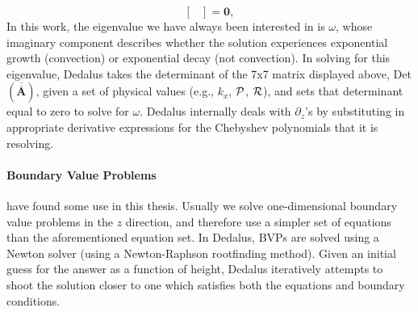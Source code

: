 \begin{enumerate}
\begin{equation}
\begin{bmatrix}
\end{bmatrix}
= \bm{0},
\end{equation}
In this work, the eigenvalue we have always been interested in is $\omega$, whose imaginary component describes whether the solution experiences exponential growth (convection) or exponential decay (not convection).
In solving for this eigenvalue, Dedalus takes the determinant of the 7x7 matrix displayed above, Det$(\bm{\overline{\overline{A}}})$, given a set of physical values (e.g., $k_x$, $\mathcal{P}$, $\mathcal{R}$), and sets that determinant equal to zero to solve for $\omega$.
Dedalus internally deals with $\partial_z$'s by substituting in appropriate derivative expressions for the Chebyshev polynomials that it is resolving.
\end{enumerate}

\paragraph{Boundary Value Problems} have found some use in this thesis.
Usually we solve one-dimensional boundary value problems in the $z$ direction, and therefore use a simpler set of equations than the aforementioned equation set.
In Dedalus, BVPs are solved using a Newton solver (using a Newton-Raphson rootfinding method).
Given an initial guess for the answer as a function of height, Dedalus iteratively attempts to shoot the solution closer to one which satisfies both the equations and boundary conditions.






